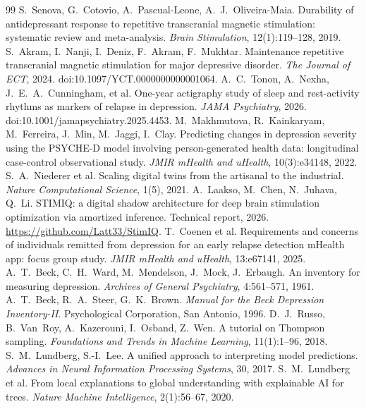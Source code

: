\documentclass[11pt,a4paper]{article}
\begin{document}
\FloatBarrier
\begin{thebibliography}{99}\small
{} S.~Senova, G.~Cotovio, A.~Pascual-Leone, A.~J.~Oliveira-Maia. Durability of antidepressant response to repetitive transcranial magnetic stimulation: systematic review and meta-analysis. \emph{Brain Stimulation}, 12(1):119--128, 2019.
 S.~Akram, I.~Nanji, I.~Deniz, F.~Akram, F.~Mukhtar. Maintenance repetitive transcranial magnetic stimulation for major depressive disorder. \emph{The Journal of ECT}, 2024. doi:10.1097/YCT.0000000000001064.
 A.~C.~Tonon, A.~Nexha, J.~E.~A.~Cunningham, et al. One-year actigraphy study of sleep and rest-activity rhythms as markers of relapse in depression. \emph{JAMA Psychiatry}, 2026. doi:10.1001/jamapsychiatry.2025.4453.
 M.~Makhmutova, R.~Kainkaryam, M.~Ferreira, J.~Min, M.~Jaggi, I.~Clay. Predicting changes in depression severity using the PSYCHE-D model involving person-generated health data: longitudinal case-control observational study. \emph{JMIR mHealth and uHealth}, 10(3):e34148, 2022.
 S.~A.~Niederer et al. Scaling digital twins from the artisanal to the industrial. \emph{Nature Computational Science}, 1(5), 2021.
 A.~Laakso, M.~Chen, N.~Juhava, Q.~Li. STIMIQ: a digital shadow architecture for deep brain stimulation optimization via amortized inference. Technical report, 2026. \url{https://github.com/Latt33/StimIQ}.
 T.~Coenen et al. Requirements and concerns of individuals remitted from depression for an early relapse detection mHealth app: focus group study. \emph{JMIR mHealth and uHealth}, 13:e67141, 2025.
 A.~T.~Beck, C.~H.~Ward, M.~Mendelson, J.~Mock, J.~Erbaugh. An inventory for measuring depression. \emph{Archives of General Psychiatry}, 4:561--571, 1961.
 A.~T.~Beck, R.~A.~Steer, G.~K.~Brown. \emph{Manual for the Beck Depression Inventory-II}. Psychological Corporation, San Antonio, 1996.
 D.~J.~Russo, B.~Van~Roy, A.~Kazerouni, I.~Osband, Z.~Wen. A tutorial on Thompson sampling. \emph{Foundations and Trends in Machine Learning}, 11(1):1--96, 2018.
 S.~M.~Lundberg, S.-I.~Lee. A unified approach to interpreting model predictions. \emph{Advances in Neural Information Processing Systems}, 30, 2017.
 S.~M.~Lundberg et al. From local explanations to global understanding with explainable AI for trees. \emph{Nature Machine Intelligence}, 2(1):56--67, 2020.
\end{thebibliography}
\end{document}
